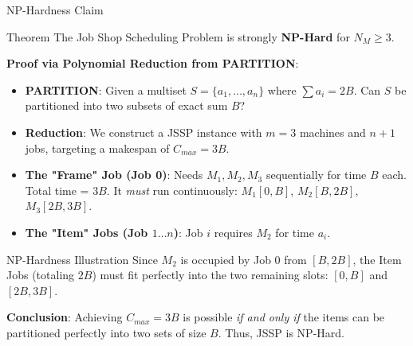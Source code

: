 \documentclass{beamer}
\begin{document}
\begin{frame}{NP-Hardness Claim}
    \begin{block}{Theorem}
        The Job Shop Scheduling Problem is strongly \textbf{NP-Hard} for $N_M \ge 3$.
    \end{block}
    
    \pause
    \vspace{0.5em}
    \textbf{Proof via Polynomial Reduction from PARTITION}:
    \begin{itemize}[<+->]
        \item \textbf{PARTITION}: Given a multiset $S = \{a_1, \dots, a_n\}$ where $\sum a_i = 2B$. Can $S$ be partitioned into two subsets of exact sum $B$?
        \item \textbf{Reduction}: We construct a JSSP instance with $m=3$ machines and $n+1$ jobs, targeting a makespan of $C_{max} = 3B$.
        \item \textbf{The "Frame" Job (Job 0)}: Needs $M_1, M_2, M_3$ sequentially for time $B$ each. Total time = $3B$. It \textit{must} run continuously: $M_1 [0,B]$, $M_2 [B,2B]$, $M_3 [2B,3B]$.
        \item \textbf{The "Item" Jobs (Job $1 \dots n$)}: Job $i$ requires $M_2$ for time $a_i$.
    \end{itemize}
\end{frame}

\begin{frame}{NP-Hardness Illustration}
    Since $M_2$ is occupied by Job 0 from $[B, 2B]$, the Item Jobs (totaling $2B$) must fit perfectly into the two remaining slots: $[0, B]$ and $[2B, 3B]$.
    
    \vspace{1em}
    \centering
    
    \vspace{1em}
    \pause
    \textbf{Conclusion}: Achieving $C_{max}=3B$ is possible \textit{if and only if} the items can be partitioned perfectly into two sets of size $B$. Thus, JSSP is NP-Hard.
\end{frame}
\end{document}
